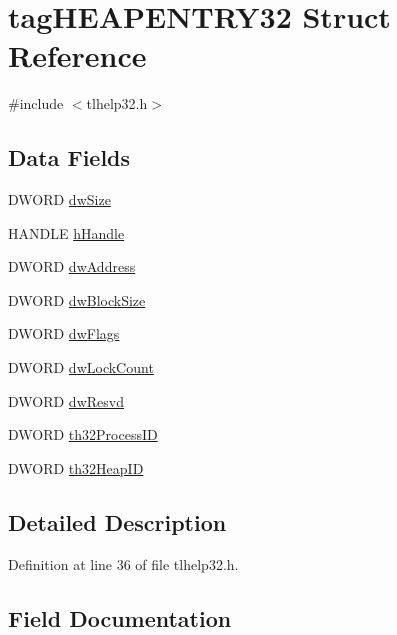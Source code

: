 \hypertarget{structtag_h_e_a_p_e_n_t_r_y32}{}\section{tag\+H\+E\+A\+P\+E\+N\+T\+R\+Y32 Struct Reference}
\label{structtag_h_e_a_p_e_n_t_r_y32}


{\ttfamily \#include $<$tlhelp32.\+h$>$}

\subsection*{Data Fields}
\begin{DoxyCompactItemize}
\item 
D\+W\+O\+RD \hyperlink{structtag_h_e_a_p_e_n_t_r_y32_a669c5a85f5a9eb97e64ad880fadaaa2d}{dw\+Size}
\item 
H\+A\+N\+D\+LE \hyperlink{structtag_h_e_a_p_e_n_t_r_y32_a66967d9f9335457e39a28833a9da7932}{h\+Handle}
\item 
D\+W\+O\+RD \hyperlink{structtag_h_e_a_p_e_n_t_r_y32_afbbec435d6d7895aa7ed48ba5f5a6ff0}{dw\+Address}
\item 
D\+W\+O\+RD \hyperlink{structtag_h_e_a_p_e_n_t_r_y32_a1a46dbc99f858284f9037be54ff3123c}{dw\+Block\+Size}
\item 
D\+W\+O\+RD \hyperlink{structtag_h_e_a_p_e_n_t_r_y32_a4d2f405b1141000eb2af256e0fc8b98b}{dw\+Flags}
\item 
D\+W\+O\+RD \hyperlink{structtag_h_e_a_p_e_n_t_r_y32_a8b9f201b97938b6450beddd29b9db86b}{dw\+Lock\+Count}
\item 
D\+W\+O\+RD \hyperlink{structtag_h_e_a_p_e_n_t_r_y32_a3eddb3e1ca925f283fd8b1483864858e}{dw\+Resvd}
\item 
D\+W\+O\+RD \hyperlink{structtag_h_e_a_p_e_n_t_r_y32_a4e94a85eb6671f7346bc1fb284f56186}{th32\+Process\+ID}
\item 
D\+W\+O\+RD \hyperlink{structtag_h_e_a_p_e_n_t_r_y32_a382f1b4f880ccd90252ea23ad7adec98}{th32\+Heap\+ID}
\end{DoxyCompactItemize}


\subsection{Detailed Description}


Definition at line 36 of file tlhelp32.\+h.



\subsection{Field Documentation}
